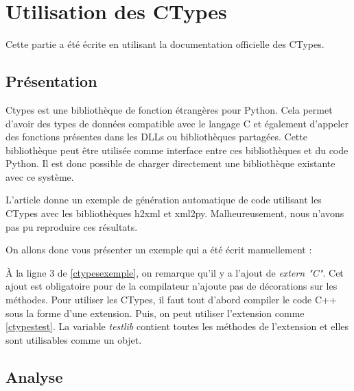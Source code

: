 \documentclass[11pt, french, screen]{report-rd-info}
\begin{document}
\section{Utilisation des CTypes}

Cette partie a été écrite en utilisant la documentation officielle des CTypes\cite{pythonctypes}.

\subsection{Présentation}

Ctypes est une bibliothèque de fonction étrangères pour Python. Cela permet d'avoir des types de données compatible avec le langage C et également d'appeler des fonctions présentes dans les DLLs ou bibliothèques partagées. Cette bibliothèque peut être utilisée comme interface entre ces bibliothèques et du code Python. Il est donc possible de charger directement une bibliothèque existante avec ce système.

L'article \cite{2008ACLWCFTTGuy} donne un exemple de génération automatique de code utilisant les CTypes avec les bibliothèques h2xml et xml2py. Malheureusement, nous n'avons pas pu reproduire ces résultats.

On allons donc vous présenter un exemple qui a été écrit manuellement :







À la ligne 3 de \ref{ctypesexemple}, on remarque qu'il y a l'ajout de \emph{extern "C"}. Cet ajout est obligatoire pour de la compilateur n'ajoute pas de décorations sur les méthodes. Pour utiliser les CTypes, il faut tout d'abord compiler le code C++ sous la forme d'une extension. Puis, on peut utiliser l'extension comme \ref{ctypestest}. La variable \emph{testlib} contient toutes les méthodes de l'extension et elles sont utilisables comme un objet.

\subsection{Analyse}
\end{document}

